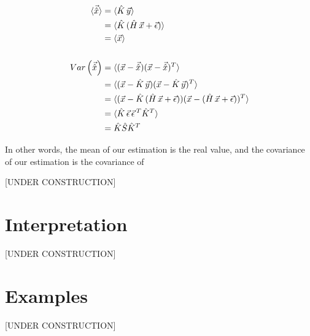 \begin{align*}
    \braket{\vec{\hat{x}}}&=\braket{\hat{K}\,\vec{y}}
    \\
    &=\braket{\hat{K}\,(\hat{H}\,\vec{x}+\vec{\epsilon})}
    \\
    &=\braket{\vec{x}}
    \\
    \\
    Var\left(\vec{\hat{x}}\right)&
    =\braket{(\vec{x}-\vec{\hat{x}})(\vec{x}-\vec{\hat{x}})^T}
    \\
    &=\braket{(\vec{x}-\hat{K}\,\vec{y})(\vec{x}-\hat{K}\,\vec{y})^T}
    \\
    &
    =\braket{(\vec{x}-\hat{K}\,(\hat{H}\,\vec{x}+\vec{\epsilon}))(\vec{x}-(\hat{H}\,\vec{x}+\vec{\epsilon}))^T}
    \\
    &=\braket{\hat{K}\,\vec{\epsilon}\,\vec{\epsilon}\,^T\hat{K}^T}
    \\
    &=\hat{K}\hat{S}\hat{K}^T
\end{align*}

In other words, the mean of our estimation is the real value, and the covariance of our estimation is the covariance of 

[UNDER CONSTRUCTION]

\section{Interpretation}

[UNDER CONSTRUCTION]

\section{Examples}

[UNDER CONSTRUCTION]